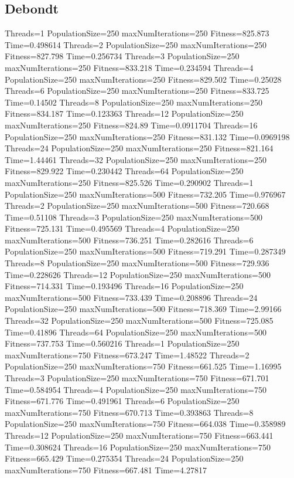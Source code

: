 \documentclass[10pt,letterpaper]{article}
\begin{document}
\subsection{Debondt}
Threads=1 PopulationSize=250 maxNumIterations=250 Fitness=825.873 Time=0.498614
Threads=2 PopulationSize=250 maxNumIterations=250 Fitness=827.798 Time=0.256734
Threads=3 PopulationSize=250 maxNumIterations=250 Fitness=833.218 Time=0.234594
Threads=4 PopulationSize=250 maxNumIterations=250 Fitness=829.502 Time=0.25028
Threads=6 PopulationSize=250 maxNumIterations=250 Fitness=833.725 Time=0.14502
Threads=8 PopulationSize=250 maxNumIterations=250 Fitness=834.187 Time=0.123363
Threads=12 PopulationSize=250 maxNumIterations=250 Fitness=824.89 Time=0.0911704
Threads=16 PopulationSize=250 maxNumIterations=250 Fitness=831.132 Time=0.0969198
Threads=24 PopulationSize=250 maxNumIterations=250 Fitness=821.164 Time=1.44461
Threads=32 PopulationSize=250 maxNumIterations=250 Fitness=829.922 Time=0.230442
Threads=64 PopulationSize=250 maxNumIterations=250 Fitness=825.526 Time=0.290902
Threads=1 PopulationSize=250 maxNumIterations=500 Fitness=732.205 Time=0.976967
Threads=2 PopulationSize=250 maxNumIterations=500 Fitness=720.668 Time=0.51108
Threads=3 PopulationSize=250 maxNumIterations=500 Fitness=725.131 Time=0.495569
Threads=4 PopulationSize=250 maxNumIterations=500 Fitness=736.251 Time=0.282616
Threads=6 PopulationSize=250 maxNumIterations=500 Fitness=719.291 Time=0.287349
Threads=8 PopulationSize=250 maxNumIterations=500 Fitness=729.936 Time=0.228626
Threads=12 PopulationSize=250 maxNumIterations=500 Fitness=714.331 Time=0.193496
Threads=16 PopulationSize=250 maxNumIterations=500 Fitness=733.439 Time=0.208896
Threads=24 PopulationSize=250 maxNumIterations=500 Fitness=718.369 Time=2.99166
Threads=32 PopulationSize=250 maxNumIterations=500 Fitness=725.085 Time=0.41896
Threads=64 PopulationSize=250 maxNumIterations=500 Fitness=737.753 Time=0.560216
Threads=1 PopulationSize=250 maxNumIterations=750 Fitness=673.247 Time=1.48522
Threads=2 PopulationSize=250 maxNumIterations=750 Fitness=661.525 Time=1.16995
Threads=3 PopulationSize=250 maxNumIterations=750 Fitness=671.701 Time=0.584954
Threads=4 PopulationSize=250 maxNumIterations=750 Fitness=671.776 Time=0.491961
Threads=6 PopulationSize=250 maxNumIterations=750 Fitness=670.713 Time=0.393863
Threads=8 PopulationSize=250 maxNumIterations=750 Fitness=664.038 Time=0.358989
Threads=12 PopulationSize=250 maxNumIterations=750 Fitness=663.441 Time=0.308624
Threads=16 PopulationSize=250 maxNumIterations=750 Fitness=665.429 Time=0.275354
Threads=24 PopulationSize=250 maxNumIterations=750 Fitness=667.481 Time=4.27817
\end{document}
